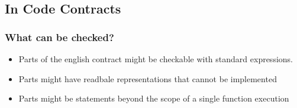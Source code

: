 {\begin{frame}
\end{frame}


\begin{frame}
   \\ \pause
   \\ \pause
\end{frame}
  
\subsection{In Code Contracts}
\begin{frame}
  \frametitle{What can be checked?}

  \begin{itemize}
  \item Parts of the english contract might be checkable with standard \Cpp expressions. \pause
  \item Parts might have readbale representations that cannot be implemented \pause
  \item Parts might be statements beyond the scope of a single function execution
  \end{itemize}
\end{frame}

  }
  
%



